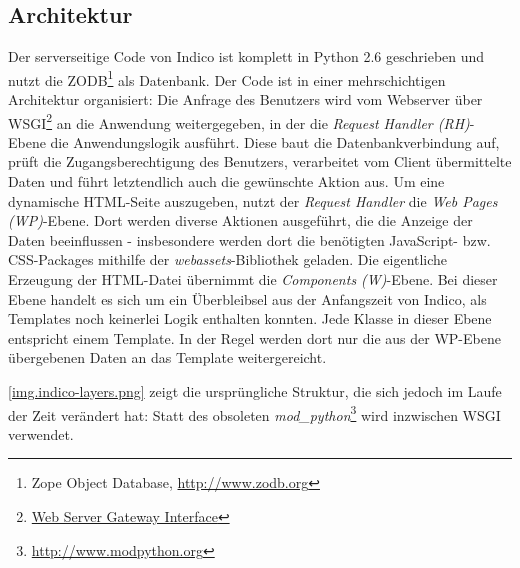 \subsection{Architektur}
Der serverseitige Code von Indico ist komplett in Python 2.6 geschrieben und nutzt die
ZODB\footnote{Zope Object Database, \href{http://www.zodb.org}{http://www.zodb.org}} als Datenbank.
Der Code ist in einer mehrschichtigen Architektur organisiert: Die Anfrage des Benutzers wird vom
Webserver über WSGI\footnote{\href{http://www.python.org/dev/peps/pep-0333/}{Web Server Gateway
Interface}} an die Anwendung weitergegeben, in der die \emph{Request Handler (RH)}-Ebene die
Anwendungslogik ausführt. Diese baut die Datenbankverbindung auf, prüft die Zugangsberechtigung des
Benutzers, verarbeitet vom Client übermittelte Daten und führt letztendlich auch die gewünschte
Aktion aus. Um eine dynamische HTML-Seite auszugeben, nutzt der \emph{Request Handler} die
\emph{Web Pages (WP)}-Ebene. Dort werden diverse Aktionen ausgeführt, die die Anzeige der Daten
beeinflussen - insbesondere werden dort die benötigten JavaScript- bzw. CSS-Packages mithilfe der
\emph{webassets}-Bibliothek geladen. Die eigentliche Erzeugung der HTML-Datei übernimmt die
\emph{Components (W)}-Ebene. Bei dieser Ebene handelt es sich um ein Überbleibsel aus der
Anfangszeit von Indico, als Templates noch keinerlei Logik enthalten konnten. Jede Klasse in dieser
Ebene entspricht einem Template. In der Regel werden dort nur die aus der WP-Ebene übergebenen Daten
an das Template weitergereicht.

\autoref{img.indico-layers.png} zeigt die ursprüngliche Struktur, die sich jedoch im Laufe der Zeit
verändert hat: Statt des obsoleten
\emph{mod\_python}\footnote{\href{http://www.modpython.org}{http://www.modpython.org}} wird
inzwischen WSGI verwendet.

